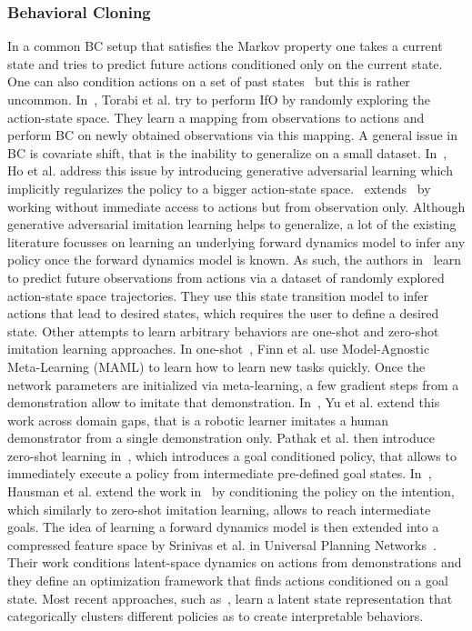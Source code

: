\subsubsection{Behavioral Cloning}
In a common BC setup that satisfies the Markov property one takes a current state and tries to predict future actions conditioned only on the current state. One can also condition actions on a set of past states~\cite{xu2017end} but this is rather uncommon. In~\cite{torabi2018behavioral}, Torabi et al. try to perform IfO by randomly exploring the action-state space. They learn a mapping from observations to actions and perform BC on newly obtained observations via this mapping. A general issue in BC is covariate shift, that is the inability to generalize on a small dataset. In~\cite{ho2016generative}, Ho et al. address this issue by introducing generative adversarial learning which implicitly regularizes the policy to a bigger action-state space.~\cite{torabi2018generative} extends~\cite{ho2016generative} by working without immediate access to actions but from observation only. Although generative adversarial imitation learning helps to generalize, a lot of the existing literature focusses on learning an underlying forward dynamics model to infer any policy once the forward dynamics model is known. As such, the authors in~\cite{finn2016unsupervised, finn2017deep, nair2017combining} learn to predict future observations from actions via a dataset of randomly explored action-state space trajectories. They use this state transition model to infer actions that lead to desired states, which requires the user to define a desired state. Other attempts to learn arbitrary behaviors are one-shot and zero-shot imitation learning approaches. In one-shot~\cite{finn2017one}, Finn et al. use Model-Agnostic Meta-Learning (MAML) to learn how to learn new tasks quickly. Once the network parameters are initialized via meta-learning, a few gradient steps from a demonstration allow to imitate that demonstration. In~\cite{yu2018one}, Yu et al. extend this work across domain gaps, that is a robotic learner imitates a human demonstrator from a single demonstration only. Pathak et al. then introduce zero-shot learning in~\cite{pathak2018zero}, which introduces a goal conditioned policy, that allows to immediately execute a policy from intermediate pre-defined goal states. In~\cite{hausman2017multi}, Hausman et al. extend the work in~\cite{ho2016generative} by conditioning the policy on the intention, which similarly to zero-shot imitation learning, allows to reach intermediate goals. The idea of learning a forward dynamics model is then extended into a compressed feature space by Srinivas et al. in Universal Planning Networks~\cite{srinivas2018universal}. Their work conditions latent-space dynamics on actions from demonstrations and they define an optimization framework that finds actions conditioned on a goal state. Most recent approaches, such as~\cite{lynch2020learning}, learn a latent state representation that categorically clusters different policies as to create interpretable behaviors.


